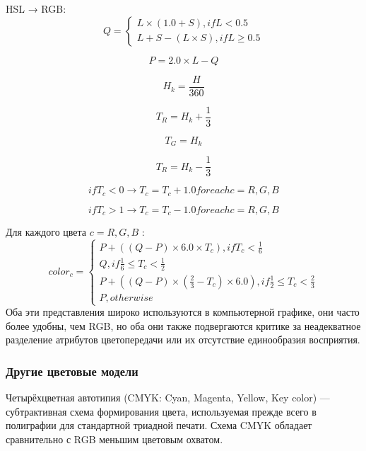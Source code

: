 HSL → RGB: \\
 \begin{equation}
Q={\begin{cases} L \times (1.0 + S), if L < 0.5 \\
	L + S - (L\times S), if L \geq 0.5
	\end{cases}}
\end{equation}

\begin{equation}
P = 2.0 \times L - Q
\end{equation}

\begin{equation}
H_{k} = \frac{H}{360}
\end{equation}

\begin{equation}
T_{R} = H_{k} + \frac{1}{3}
\end{equation}

\begin{equation}
T_{G} = H_{k}
\end{equation}

\begin{equation}
T_{R} = H_{k} - \frac{1}{3}
\end{equation}

\begin{equation}
if T_{c} < 0  → T_{c} = T_{c} + 1.0 for 	each 	 c = R,G,B
\end{equation}


\begin{equation}
if T_{c} > 1 → T_{c} = T_{c} - 1.0 for each  c = R,G,B
\end{equation}

Для каждого цвета $c=R,G,B$ :
\begin{equation}
color_{c}={\begin{cases} P+((Q-P) \times 6.0 \times T_{c}), if T_{c} <\frac{1}{6} \\
	Q, if \frac{1}{6} \leq T_{c} < \frac{1}{2} \\
	P + ((Q-P)\times (\frac{2}{3} -T_{c}) \times 6.0), if \frac{1}{2} \leq T_{c} < \frac{2}{3} \\
	P, otherwise
	\end{cases}}
\end{equation}
Оба эти представления широко используются в компьютерной графике, они часто более удобны, чем RGB, но оба они также подвергаются критике за неадекватное разделение атрибутов цветопередачи или их отсутствие единообразия восприятия.
\subsubsection{Другие цветовые модели}
Четырёхцветная автотипия (CMYK: Cyan, Magenta, Yellow, Key color)\cite{bib6} — субтрактивная схема формирования цвета, используемая прежде всего в полиграфии для стандартной триадной печати. Схема CMYK обладает сравнительно с RGB меньшим цветовым охватом.

